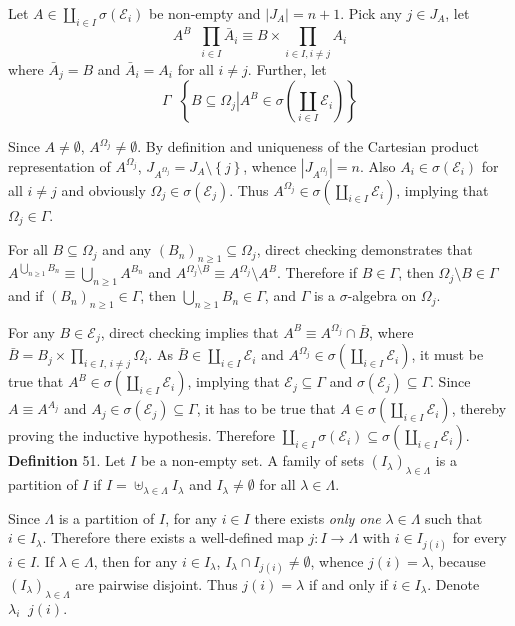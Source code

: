 \documentclass[a4paper]{article}
\newcommand{\obj}[1]{\left\{ #1 \right \}}
\newcommand{\brac}[1]{\left ( #1 \right )}
\newcommand{\induc}[1]{\left . #1 \right \vert}
\newcommand{\abs}[1]{\left | #1 \right |}
\newcommand{\Ecal}{\mathcal{E}}
\newcommand{\defn}{\mathop{\overset{\Delta}{=}}\nolimits}
\begin{document}
Let $A\in \coprod_{i\in I} \sigma\brac{ \Ecal_i }$ be non-empty and $\abs{J_A} = n + 1$. Pick any $j\in J_A$, let \[A^B \defn \prod_{i\in I} \bar{A}_i \equiv B \times \prod_{i\in I, i\neq j} A_i\] where $\bar{A}_j = B$ and $\bar{A}_i = A_i$ for all $i\neq j$. Further, let \[\Gamma \defn \obj{ \induc{ B\subseteq \Omega_j } A^B \in \sigma\brac{ \coprod_{i\in I} \Ecal_i } }\]

Since $A\neq \emptyset$, $A^{\Omega_j} \neq \emptyset$. By definition and uniqueness of the Cartesian product representation of $A^{\Omega_j}$, $J_{A^{\Omega_j}} = J_A\setminus \obj{j}$, whence $\abs{ J_{A^{\Omega_j}} } = n$. Also $A_i\in \sigma\brac{\Ecal_i}$ for all $i\neq j$ and obviously $\Omega_j\in \sigma\brac{\Ecal_j}$. Thus $A^{\Omega_j} \in \sigma\brac{ \coprod_{i\in I} \Ecal_i }$, implying that $\Omega_j \in \Gamma$.

For all $B\subseteq \Omega_j$ and any $\brac{B_n}_{n\geq 1}\subseteq \Omega_j$, direct checking demonstrates that $A^{\bigcup_{n\geq 1} B_n} \equiv \bigcup_{n\geq 1} A^{B_n}$ and $A^{\Omega_j\setminus B} \equiv A^{\Omega_j}\setminus A^B$. Therefore if $B\in\Gamma$, then $\Omega_j\setminus B\in \Gamma$ and if $\brac{B_n}_{n\geq 1}\in \Gamma$, then $\bigcup_{n\geq 1} B_n\in \Gamma$, and $\Gamma$ is a $\sigma$-algebra on $\Omega_j$.

For any $B\in \Ecal_j$, direct checking implies that $A^B \equiv A^{\Omega_j} \cap \bar{B}$, where $\bar{B} = B_j \times \prod_{i\in I,\, i\neq j} \Omega_i$. As $\bar{B} \in \coprod_{i\in I} \Ecal_i$ and $A^{\Omega_j} \in \sigma\brac{\coprod_{i\in I} \Ecal_i}$, it must be true that $A^B \in \sigma\brac{\coprod_{i\in I} \Ecal_i}$, implying that $\Ecal_j\subseteq \Gamma$ and  $\sigma\brac{\Ecal_j} \subseteq \Gamma$. Since $A \equiv A^{A_j}$ and $A_j\in \sigma\brac{\Ecal_j}\subseteq \Gamma$, it has to be true that $A\in \sigma\brac{\coprod_{i\in I} \Ecal_i}$, thereby proving the inductive hypothesis. Therefore $\coprod_{i\in I} \sigma\brac{ \Ecal_i } \subseteq \sigma\brac{ \coprod_{i\in I} \Ecal_i }$.\\

\noindent \textbf{Definition} 51.
Let $I$ be a non-empty set. A family of sets $\brac{I_\lambda}_{\lambda \in \Lambda}$ is a partition of $I$ if $I = \uplus_{\lambda\in \Lambda} I_\lambda$ and $I_\lambda \neq \emptyset$ for all $\lambda\in \Lambda$.

Since $\Lambda$ is a partition of $I$, for any $i \in I$ there exists \emph{only one} $\lambda \in \Lambda$ such that $i \in I_\lambda$. Therefore there exists a well-defined map $j: I\to \Lambda$ with $i\in I_{j\brac{i}}$ for every $i\in I$. If $\lambda\in \Lambda$, then for any $i\in I_\lambda$, $I_\lambda \cap I_{j\brac{i}}\neq \emptyset$, whence $j\brac{i} = \lambda$, because $\brac{I_\lambda}_{\lambda\in \Lambda}$ are pairwise disjoint. Thus $j\brac{i} = \lambda$ if and only if $i\in I_\lambda$. Denote $\lambda_i\defn j\brac{i}$.\\
\end{document}
